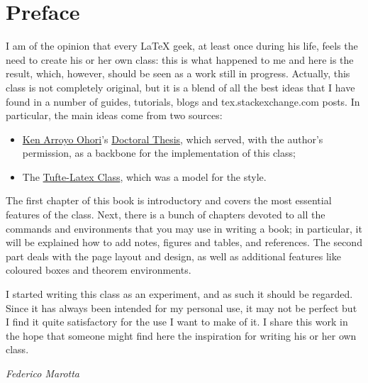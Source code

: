\chapter*{Preface}

I am of the opinion that every \LaTeX\xspace geek, at least once during 
his life, feels the need to create his or her own class: this is what 
happened to me and here is the result, which, however, should be seen as 
a work still in progress. Actually, this class is not completely 
original, but it is a blend of all the best ideas that I have found in a 
number of guides, tutorials, blogs and tex.stackexchange.com posts. In 
particular, the main ideas come from two sources:

\begin{itemize}
	\item \href{https://3d.bk.tudelft.nl/ken/en/}{Ken Arroyo Ohori}'s 
	\href{https://3d.bk.tudelft.nl/ken/en/nl/ken/en/2016/04/17/a-1.5-column-layout-in-latex.html}{Doctoral 
	Thesis}, which served, with the author's permission, as a backbone 
	for the implementation of this class;
	\item The 
		\href{https://github.com/Tufte-LaTeX/tufte-latex}{Tufte-Latex 
			Class}, which was a model for the style.
\end{itemize}

The first chapter of this book is introductory and covers the most
essential features of the class. Next, there is a bunch of chapters 
devoted to all the commands and environments that you may use in writing 
a book; in particular, it will be explained how to add notes, figures 
and tables, and references. The second part deals with the page layout 
and design, as well as additional features like coloured boxes and 
theorem environments.

I started writing this class as an experiment, and as such it should be 
regarded. Since it has always been intended for my personal use, it may
not be perfect but I find it quite satisfactory for the use I want to 
make of it. I share this work in the hope that someone might find here 
the inspiration for writing his or her own class.

\begin{flushright}
	\textit{Federico Marotta}
\end{flushright}
